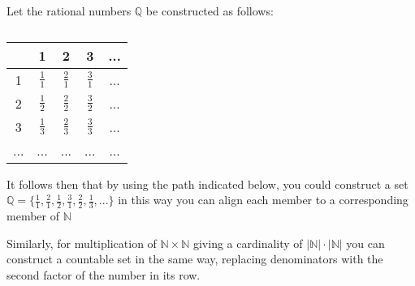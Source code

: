 
Let the rational  numbers $\mathbb{Q}$ be constructed as follows:
\begin{table}[h]
    \centering
    \begin{tabular}{|c|c|c|c|c|}
        \hline
        & 1 & 2 & 3 & ...\\ \hline
        1 & $\frac{1}{1}$   & $\frac{2}{1}$   & $\frac{3}{1}$ & ...  \\ \hline
        2 & $\frac{1}{2}$   & $\frac{2}{2}$   & $\frac{3}{2}$  & ...   \\ \hline
        3 & $\frac{1}{3}$  & $\frac{2}{3}$  & $\frac{3}{3}$ & ... \\ \hline
        ... & ...  & ...& ...& ... \\ \hline
    \end{tabular}
    \label{tab:placeholder_label}
    \caption{\cite{suber1998crash}}
\end{table}

It follows then that by using the path indicated below, you could construct a set $\mathbb{Q} = \{ \frac{1}{1}, \frac{2}{1}, \frac{1}{2}, \frac{3}{1}, \frac{2}{2}, \frac{1}{3}, ...\}$
in this way you can align each member to a corresponding member of $\mathbb{N}$ 

Similarly, for multiplication of $\mathbb{N} \times \mathbb{N}$ giving a cardinality of $\lvert{\mathbb{N}}\rvert \cdot \lvert{\mathbb{N}}\rvert$ you can construct a countable set in the same way, replacing denominators with the second factor of the number in its row.






